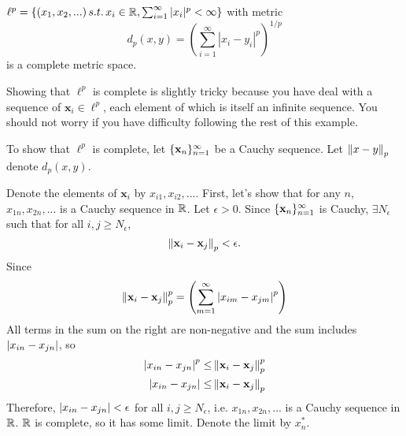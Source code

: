 \begin{example}
  $\ell^p = \{ (x_1, x_2, ...)\, s.t.\, x_i \in \mathbb{R}, \sum_{i=1}^\infty |x_i|^p <
  \infty \}$ with metric
  \[ d_p(x,y) = \left( \sum_{i=1}^\infty |x_i - y_i|^p \right)^{1/p} \]
  is a complete metric space. 
    
  Showing that $\ell^p$ is complete is slightly tricky because you
  have deal with a sequence of $\mathbf{x}_i \in \ell^p$, each element
  of which is itself an infinite sequence. You should not worry if you
  have difficulty following the rest of this example.
  
  To show that $\ell^p$ is complete, let $\{{\mathbf{x}}_n \}_{n=1}^\infty$ be a
  Cauchy sequence. Let $\left\Vert {x-y} \right\Vert_p$ denote $d_p(x,y)$.

  Denote the elements of $\mathbf{x}_i$ by $x_{i1},
  x_{i2}, ... $. First, let's show that for any $n$, $x_{1n}, x_{2n},
  ... $ is a Cauchy sequence in $\mathbb{R}$. Let $\epsilon > 0$. Since
  $\{{\mathbf{x}}_n \}_{n=1}^\infty$ is Cauchy, $\exists N_\epsilon$ such that for all $i,j
  \geq N_\epsilon$, 
  \[  \left\Vert {\mathbf{x}_i - \mathbf{x}_j } \right\Vert_p < \epsilon. \]
  Since 
  \[ \left\Vert {\mathbf{x}_i - \mathbf{x}_j } \right\Vert_p^p = \left( \sum_{m=1}^\infty
    \left\vert {x_{i m} - x_{j m}} \right\vert^p \right) \]
  All terms in the sum on the right are non-negative and the sum
  includes $\left\vert {x_{i n} - x_{jn}} \right\vert$, so 
  \begin{align*} \left\vert {x_{i n} - x_{j n} } \right\vert^p \leq & \left\Vert {\mathbf{x}_i -
      \mathbf{x}_j } \right\Vert_p^p \\
    \left\vert {x_{i n} - x_{j n} } \right\vert \leq & 
    \left\Vert {\mathbf{x}_i - \mathbf{x}_j } \right\Vert_p  
  \end{align*}
  Therefore, $\left\vert {x_{i n} - x_{j n}} \right\vert < \epsilon$ for all $i,j \geq
  N_\epsilon$, i.e. $x_{1n}, x_{2n}, ...$ is a Cauchy sequence in
  $\mathbb{R}$. $\mathbb{R}$ is complete, so it has some limit. Denote the limit by
  $x^\ast_n$.  


\end{example}

